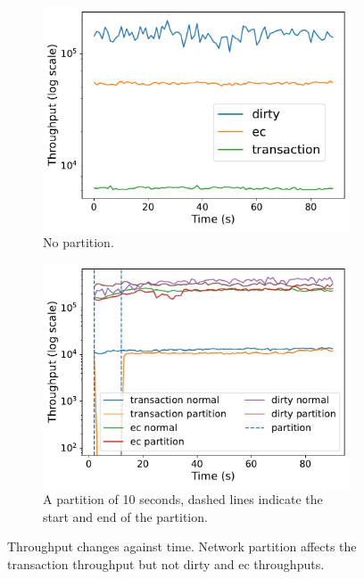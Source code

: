 \begin{figure}[htp]
  \centering
  \begin{subfigure}[t]{0.49\columnwidth}
    \centering
    \includegraphics[width=\columnwidth]{figures/tp_time_single.pdf} 
    \caption{No partition.}
    \label{fig:tp time without partition}
  \end{subfigure}
  \begin{subfigure}[t]{0.49\columnwidth}
    \centering
    \includegraphics[width=\columnwidth]{figures/tp_time_partition.pdf} 
    \caption{A partition of 10 seconds, dashed lines indicate the start and
    end of the partition.}
    \label{fig:tp time with partition}
  \end{subfigure}
  \caption{Throughput changes against time. Network partition affects the transaction
  throughput but not dirty and \acrshort{ec} throughputs.}
  \label{fig:tp time partition}
\end{figure}

